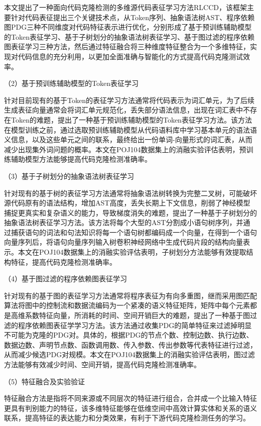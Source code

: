 本文提出了一种面向代码克隆检测的多维源代码表征学习方法RLCCD，该框架主要针对代码表征提出三个关键技术点，从Token序列、抽象语法树AST、程序依赖图PDG三种不同维度对代码特征表示进行优化，分别形成了基于预训练辅助模型的Token表征学习、基于子树划分的抽象语法树表征学习、基于图过滤的程序依赖图表征学习三种方法，然后通过特征融合将三种维度特征整合为一个多维特征，实现对代码信息的充分利用，以更加全面准确与智能化的方式提高代码克隆测试效率。 

（2）基于预训练辅助模型的Token表征学习

针对目前现有的基于Token的表征学习方法通常将代码表示为词汇单元，为了后续生成表征向量通常会将词汇单元规范化，丢失部分语法信息，出现在词汇表中不存在Token的难题，提出了一种基于预训练辅助模型的Token表征学习方法。该方法在模型训练之前，通过选取预训练辅助模型从代码语料库中学习基本单元的语法语义信息，以及这些单元之间的联系，最终给出一份单词-向量形式的词汇表，从而减少出现集外词问题的概率。本文在POJ104数据集上的消融实验评估表明，预训练辅助模型方法能够提高代码克隆检测准确率。

（3）基于子树划分的抽象语法树表征学习

针对现有的基于树的表征学习方法通常将抽象语法树转换为完整二叉树，可能破坏源代码原有的语法结构，增加AST高度，丢失长期上下文信息，削弱了神经模型捕捉更真实和复杂语义的能力，导致梯度消失的难题，提出了一种基于子树划分的抽象语法树表征学习方法。该方法将每个大型的AST分割成小语句树序列，并通过捕获语句的词法和句法知识将每一个语句树都编码成一个向量，在得到一个语句向量序列后，将语句向量序列输入树卷积神经网络中生成代码片段的结构向量表示。本文在POJ104数据集上的消融实验评估表明，子树划分方法能够有效提取结构特征，提高代码克隆检测准确率。

（4）基于图过滤的程序依赖图表征学习

针对现有的基于图的表征学习方法通常将程序表征为有向多重图，继而采用图匹配算法将图中的控制流和数据流编码为一个紧凑的语义特征矩阵，矩阵中每个元素都是高维系数特征向量，所消耗的时间、空间开销巨大的难题，提出了一种基于图过滤的程序依赖图表征学学习方法。该方法通过收集PDG的简单特征来过滤掉明显不可能为克隆的PDG对。具体的，根据PDG的节点个数、控制边数、执行边数、数据边数、声明节点数、函数调用数、传入参数、传出参数等代表特征进行过滤，从而减少候选PDG对规模。本文在POJ104数据集上的消融实验评估表明，图过滤方法能够有效减少时间、空间开销，提高代码克隆检测准确率。

（5）特征融合及实验验证

特征融合方法是指将不同来源或不同层次的特征进行组合，合并成一个比输入特征更具有判别能力的特征，该多维特征能够在低维空间中高效计算实体和关系的语义联系，提高特征的表达能力和分类效果，有利于下游代码克隆检测任务的学习。

